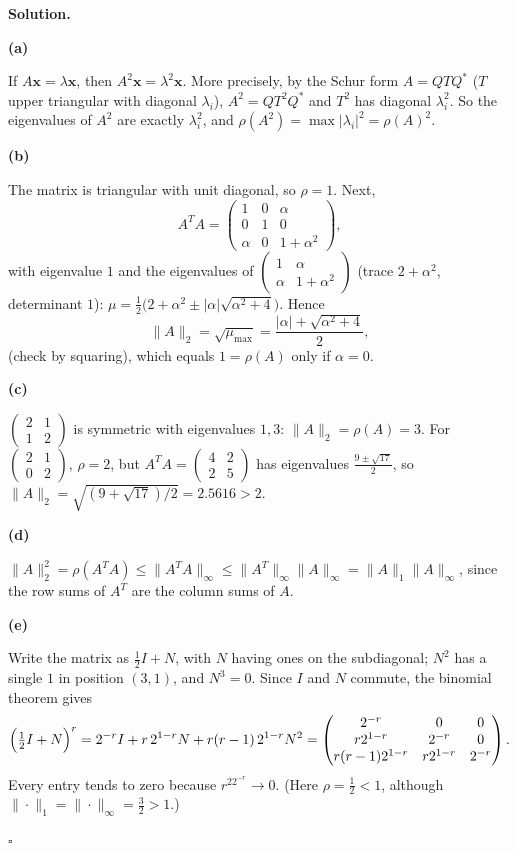 \documentclass[11pt,a4paper]{article}
\newenvironment{solution}
  {\par\noindent\textbf{Solution.}\par\nobreak}
  {\par\nobreak\noindent\hfill\(\square\)\par}
\newcommand{\step}[1]{\par\addvspace{0.5em}\noindent\textbf{#1}\par\nobreak}
\begin{document}
\begin{solution}
\step{(a)}
If \(A\mathbf x=\lambda\mathbf x\), then \(A^2\mathbf x=\lambda^2\mathbf x\).
More precisely, by the Schur form \(A=QTQ^*\) (\(T\) upper triangular
with diagonal \(\lambda_i\)), \(A^2=QT^2Q^*\) and \(T^2\) has diagonal
\(\lambda_i^2\).  So the eigenvalues of \(A^2\) are exactly
\(\lambda_i^2\), and \(\rho(A^2)=\max|\lambda_i|^2=\rho(A)^2\).

\step{(b)}
The matrix is triangular with unit diagonal, so \(\rho=1\).  Next,
\[
  A^TA=\begin{pmatrix}1&0&\alpha\\0&1&0\\ \alpha&0&1+\alpha^2\end{pmatrix},
\]
with eigenvalue \(1\) and the eigenvalues of
\(\begin{pmatrix}1&\alpha\\ \alpha&1+\alpha^2\end{pmatrix}\) (trace
\(2+\alpha^2\), determinant \(1\)):
\(\mu=\frac12\bigl(2+\alpha^2\pm|\alpha|\sqrt{\alpha^2+4}\bigr)\).  Hence
\[
  \|A\|_2=\sqrt{\mu_{\max}}=\frac{|\alpha|+\sqrt{\alpha^2+4}}2,
\]
(check by squaring), which equals \(1=\rho(A)\) only if \(\alpha=0\).

\step{(c)}
\(\begin{pmatrix}2&1\\1&2\end{pmatrix}\) is symmetric with eigenvalues
\(1,3\): \(\|A\|_2=\rho(A)=3\).  For
\(\begin{pmatrix}2&1\\0&2\end{pmatrix}\), \(\rho=2\), but
\(A^TA=\begin{pmatrix}4&2\\2&5\end{pmatrix}\) has eigenvalues
\(\frac{9\pm\sqrt{17}}2\), so
\(\|A\|_2=\sqrt{(9+\sqrt{17})/2}=2.5616>2\).

\step{(d)}
\(\|A\|_2^2=\rho(A^TA)\le\|A^TA\|_\infty\le\|A^T\|_\infty\|A\|_\infty
=\|A\|_1\|A\|_\infty\), since the row sums of \(A^T\) are the column
sums of \(A\).

\step{(e)}
Write the matrix as \(\frac12I+N\), with \(N\) having ones on the
subdiagonal; \(N^2\) has a single \(1\) in position \((3,1)\), and
\(N^3=0\).  Since \(I\) and \(N\) commute, the binomial theorem gives
\[
  \Bigl(\tfrac12I+N\Bigr)^r=2^{-r}I+r\,2^{1-r}N+r(r-1)\,2^{1-r}N^2
  =\begin{pmatrix}2^{-r}&0&0\\ r2^{1-r}&2^{-r}&0\\ r(r-1)2^{1-r}&r2^{1-r}&2^{-r}\end{pmatrix}.
\]
Every entry tends to zero because \(r^22^{-r}\to0\).  (Here
\(\rho=\frac12<1\), although \(\|\cdot\|_1=\|\cdot\|_\infty=\frac32>1\).)
\end{solution}
\end{document}
